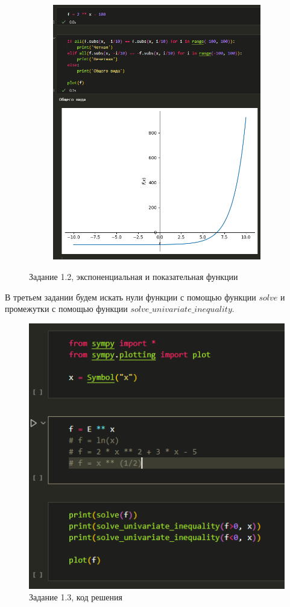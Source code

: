 \documentclass[14pt,a4paper]{extarticle}
\begin{document}
\begin{figure}[!ht]
\begin{subfigure}{.5\textwidth}
        \includegraphics[width=0.9\linewidth]{figures/1.2-a.png}
    \end{subfigure}
    \caption{Задание 1.2, экспоненциальная и показательная функции}
    \label{fig:1.2-exp}
\end{figure}

В третьем задании будем искать нули функции с помощью функции $solve$
и промежутки с помощью функции  $solve\_univariate\_inequality$.

\begin{figure}[!ht]
    \centering
    \includegraphics[width=0.5\linewidth]{figures/1.3 code.png}
    \caption{Задание 1.3, код решения}
    \label{fig:1.3-code}
\end{figure}
\end{document}
